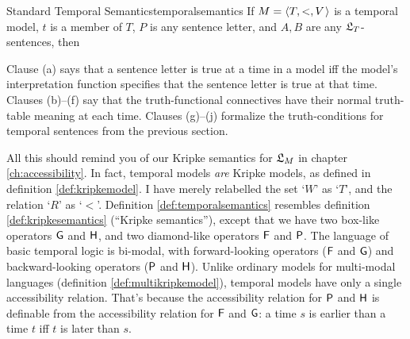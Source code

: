 \begin{definition}{Standard Temporal Semantics}{temporalsemantics}
  If $\Mfr = \t{T,<,V}$ is a temporal model, $t$ is a member of $T$, $P$ is
  any sentence letter, and $A,B$ are any $\mathfrak{L}_T$-sentences, then

  \medskip
  \begin{semantics}
  \end{semantics}
\end{definition}
Clause (a) says that a sentence letter is true at a time in a model iff the
model's interpretation function specifies that the sentence letter is true at
that time. Clauses (b)--(f) say that the truth-functional connectives have their
normal truth-table meaning at each time. Clauses (g)--(j) formalize the
truth-conditions for temporal sentences from the previous section.


All this should remind you of our Kripke semantics for $\mathfrak{L}_M$ in chapter
\ref{ch:accessibility}. In fact, temporal models \emph{are} Kripke models, as
defined in definition \ref{def:kripkemodel}. I have merely relabelled the set
`$W$' as `$T$', and the relation `$R$' as `$<$'. Definition
\ref{def:temporalsemantics} resembles definition \ref{def:kripkesemantics}
(``Kripke semantics''), except that we have two box-like operators $\operatorname{\mathsf{G}}$ and
$\operatorname{\mathsf{H}}$, and two diamond-like operators $\operatorname{\mathsf{F}}$ and $\operatorname{\mathsf{P}}$. The language of basic
temporal logic is bi-modal, with forward-looking operators ($\operatorname{\mathsf{F}}$ and $\operatorname{\mathsf{G}}$) and
backward-looking operators ($\operatorname{\mathsf{P}}$ and $\operatorname{\mathsf{H}}$). Unlike ordinary models for
multi-modal languages (definition \ref{def:multikripkemodel}), temporal models
have only a single accessibility relation. That's because the accessibility
relation for $\operatorname{\mathsf{P}}$ and $\operatorname{\mathsf{H}}$ is definable from the accessibility relation for
$\operatorname{\mathsf{F}}$ and $\operatorname{\mathsf{G}}$: a time $s$ is earlier than a time $t$ iff $t$ is later than
$s$.

